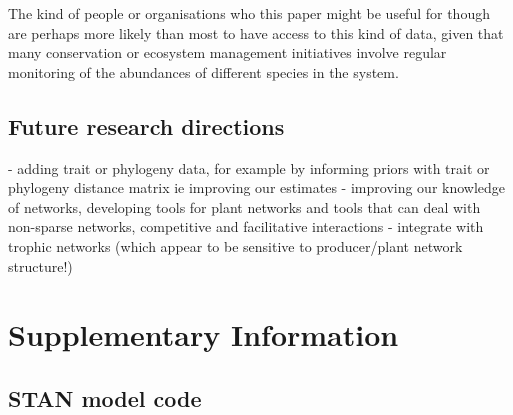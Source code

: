 \documentclass[a4,12pt]{article}
\begin{document}
        The kind of people or organisations who this paper might be useful for though are perhaps more likely than most to have access to this kind of data, given that many conservation or ecosystem management initiatives involve regular monitoring of the abundances of different species in the system. 


    \subsection{Future research directions}

    - adding trait or phylogeny data, for example by informing priors with trait or phylogeny distance matrix
    ie improving our estimates 
    - improving our knowledge of networks, developing tools for plant networks and tools that can deal with non-sparse networks, competitive and facilitative interactions 
    - integrate with trophic networks (which appear to be sensitive to producer/plant network structure!)

    

\section{Supplementary Information}

    \subsection{STAN model code}

     
\end{document}
